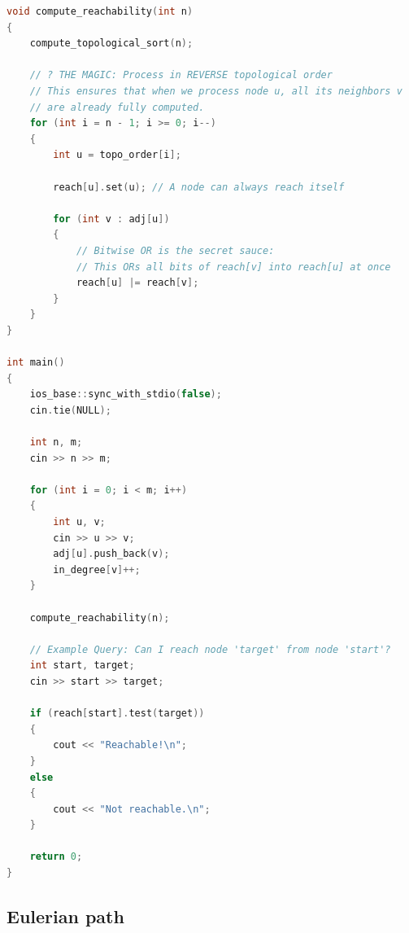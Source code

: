 \documentclass[10pt,landscape,a4paper,twocolumn]{article}
\begin{document}
\begin{lstlisting}[language=C++]
void compute_reachability(int n)
{
    compute_topological_sort(n);

    // ? THE MAGIC: Process in REVERSE topological order
    // This ensures that when we process node u, all its neighbors v
    // are already fully computed.
    for (int i = n - 1; i >= 0; i--)
    {
        int u = topo_order[i];

        reach[u].set(u); // A node can always reach itself

        for (int v : adj[u])
        {
            // Bitwise OR is the secret sauce:
            // This ORs all bits of reach[v] into reach[u] at once
            reach[u] |= reach[v];
        }
    }
}

int main()
{
    ios_base::sync_with_stdio(false);
    cin.tie(NULL);

    int n, m;
    cin >> n >> m;

    for (int i = 0; i < m; i++)
    {
        int u, v;
        cin >> u >> v;
        adj[u].push_back(v);
        in_degree[v]++;
    }

    compute_reachability(n);

    // Example Query: Can I reach node 'target' from node 'start'?
    int start, target;
    cin >> start >> target;

    if (reach[start].test(target))
    {
        cout << "Reachable!\n";
    }
    else
    {
        cout << "Not reachable.\n";
    }

    return 0;
}
\end{lstlisting}
\subsection{Eulerian path}
\end{document}
